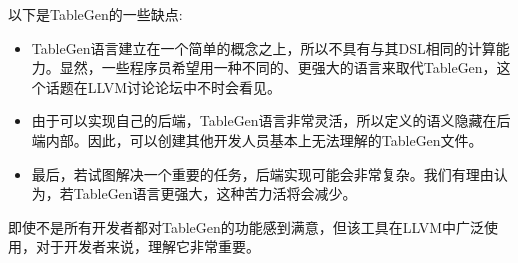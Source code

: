 
以下是TableGen的一些缺点:

\begin{itemize}
\item
TableGen语言建立在一个简单的概念之上，所以不具有与其DSL相同的计算能力。显然，一些程序员希望用一种不同的、更强大的语言来取代TableGen，这个话题在LLVM讨论论坛中不时会看见。

\item
由于可以实现自己的后端，TableGen语言非常灵活，所以定义的语义隐藏在后端内部。因此，可以创建其他开发人员基本上无法理解的TableGen文件。

\item
最后，若试图解决一个重要的任务，后端实现可能会非常复杂。我们有理由认为，若TableGen语言更强大，这种苦力活将会减少。
\end{itemize}

即使不是所有开发者都对TableGen的功能感到满意，但该工具在LLVM中广泛使用，对于开发者来说，理解它非常重要。








